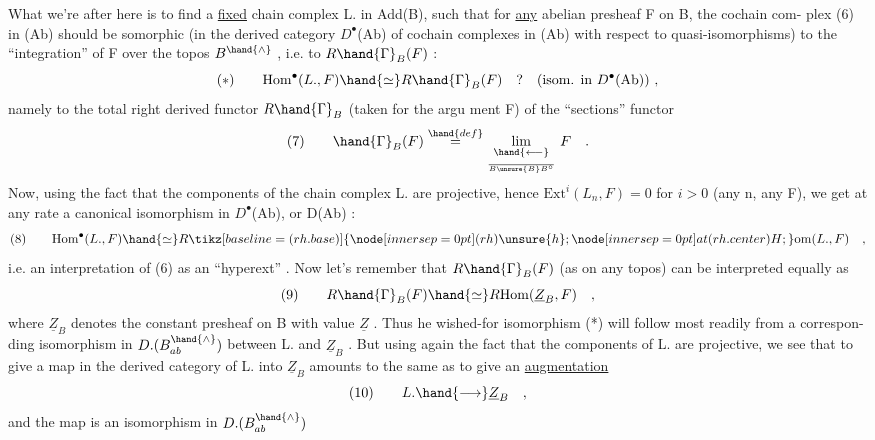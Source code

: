  What we're after here is to find a \uline{fixed} chain complex L. in
Add(B), such that for \uline{any} abelian presheaf F on B, the cochain com-%
plex (6) in (Ab) should be somorphic (in the derived category 
$D^{\bullet}$(Ab) of cochain complexes in (Ab) with respect to quasi-isomorphisms)
to the ``integration'' of F over the topos $B^{\hand{\wedge}}$ , i.e. to $R\hand{\Gamma}_B(F)$ :
\[ (*) \qquad \mathrm{Hom}^{\bullet}(L.,F)\hand{\simeq} R\hand{\Gamma}_B(F) \quad ? \quad (\text{isom. in } D^{\bullet}(\mathrm{Ab}))\ , \]
namely to the total right derived functor $R\hand{\Gamma}_B$ (taken  for the argu%
ment F) of the ``sections'' functor
\[ (7) \qquad \hand{\Gamma}_B(F) \overset{\hand{def}}{=} \underset{\over{B\unsure{B}}{B^{\circ}}}{\underset{\hand{\longleftarrow}}{\mathrm{lim}}}\ F \quad . \]
Now, using the fact that the components of the chain complex L. are
projective, hence $\mathrm{Ext}^{i}(L_n,F) = 0$ for $i > 0$ (any n, any F), we get
at any rate a canonical isomorphism in $D^{\bullet}$(Ab), or  D(Ab) :
\[ (8) \qquad \mathrm{Hom}^{\bullet}(L.,F) \hand{\simeq} R\tikz[baseline=(rh.base)]{\node[inner sep=0pt] (rh) {\ensuremath{\unsure{h}}};\node[inner sep=0pt] at (rh.center) {\ensuremath{H}};}\mathrm{om}(L.,F) \quad , \]
i.e. an interpretation of (6) as an ``hyperext'' . Now let's remember
that $R\hand{\Gamma}_B(F)$ (as on any topos) can be interpreted equally as
\[ (9) \qquad R\hand{\Gamma}_B(F)\hand{\simeq} R\mathrm{Hom}(\underline{Z}_B,F) \quad , \]
where $\underline{Z}_B$ denotes the constant presheaf on B with value $\underline{Z}$ . Thus he
wished-for isomorphism (*) will follow most readily from a correspon-%
ding isomorphism in $D.(B^{\hand{\wedge}}_{ab})$ between L. and $\underline{Z}_B$ . But using again
the fact that the components of L. are projective, we see that to give
a map in the derived category of L. into $\underline{Z}_B$ amounts to the same as to
give an \uline{augmentation}
\[ (10) \qquad L. \hand{\longrightarrow} \underline{Z}_B \quad , \]
and the map is an isomorphism in $D.(B^{\hand{\wedge}}_{ab})$



